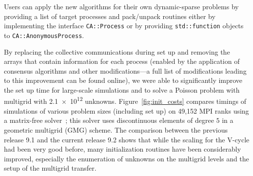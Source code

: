 \documentclass{ansarticle-preprint}
\begin{document}
Users can apply the new algorithms for their own dynamic-sparse problems by
providing a list of target
processes and pack/unpack routines either by implementing the interface
\texttt{CA::\allowbreak Process} or by providing \texttt{std::function}
objects to \texttt{CA::AnonymousProcess}.


By replacing the collective communications during set up and removing the arrays
that contain information for each process (enabled by the application of consensus
algorithms and other modifications---a full list of modifications leading to this
improvement can be found online), we were able to significantly
improve the set up
time for large-scale simulations and to solve a Poisson problem with multigrid
with \num{2.1e12} unknowns.
Figure~\ref{fig:init_costs} compares timings of simulations of various problem
sizes (including set up) on 49,152 MPI ranks using a matrix-free
solver~\cite{KronbichlerKormann2019,KronbichlerWall2018}; this solver uses discontinuous elements of
degree $5$ in a geometric multigrid (GMG) scheme. The comparison between the previous release 9.1
and the current release 9.2 shows that while the scaling for the V-cycle had been
very good before, many initialization routines have been considerably
improved, especially the enumeration of unknowns on the multigrid levels and
the setup of the multigrid transfer.

\tableinit
\end{document}
